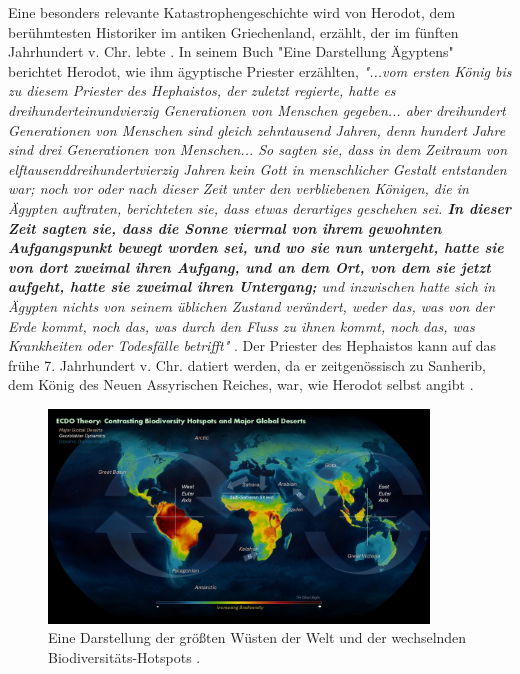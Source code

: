 \documentclass[10pt,twocolumn,letterpaper]{article}
\begin{document}
Eine besonders relevante Katastrophengeschichte wird von Herodot, dem berühmtesten Historiker im antiken Griechenland, erzählt, der im fünften Jahrhundert v. Chr. lebte \cite{31}. In seinem Buch "Eine Darstellung Ägyptens" berichtet Herodot, wie ihm ägyptische Priester erzählten, \textit{"...vom ersten König bis zu diesem Priester des Hephaistos, der zuletzt regierte, hatte es dreihunderteinundvierzig Generationen von Menschen gegeben... aber dreihundert Generationen von Menschen sind gleich zehntausend Jahren, denn hundert Jahre sind drei Generationen von Menschen... So sagten sie, dass in dem Zeitraum von elftausenddreihundertvierzig Jahren kein Gott in menschlicher Gestalt entstanden war; noch vor oder nach dieser Zeit unter den verbliebenen Königen, die in Ägypten auftraten, berichteten sie, dass etwas derartiges geschehen sei. \textbf{In dieser Zeit sagten sie, dass die Sonne viermal von ihrem gewohnten Aufgangspunkt bewegt worden sei, und wo sie nun untergeht, hatte sie von dort zweimal ihren Aufgang, und an dem Ort, von dem sie jetzt aufgeht, hatte sie zweimal ihren Untergang;} und inzwischen hatte sich in Ägypten nichts von seinem üblichen Zustand verändert, weder das, was von der Erde kommt, noch das, was durch den Fluss zu ihnen kommt, noch das, was Krankheiten oder Todesfälle betrifft"} \cite{32}. Der Priester des Hephaistos kann auf das frühe 7. Jahrhundert v. Chr. datiert werden, da er zeitgenössisch zu Sanherib, dem König des Neuen Assyrischen Reiches, war, wie Herodot selbst angibt \cite{32,33,34}.

\begin{figure}[t]
\begin{center}
\includegraphics[width=0.9\textwidth]{biodiversity.jpg}
\end{center}
   \caption{Eine Darstellung der größten Wüsten der Welt und der wechselnden Biodiversitäts-Hotspots \cite{28}.}
\label{fig:9}
\end{figure}
\end{document}
